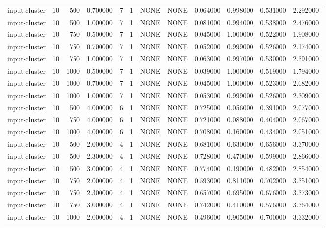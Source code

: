 \begin{tabular}{lrrrllllrrrr}
input-cluster & 10 & 500 & 0.700000 & 7 & 1 & NONE & NONE & 0.064000 & 0.998000 & 0.531000 & 2.292000 \\
input-cluster & 10 & 500 & 1.000000 & 7 & 1 & NONE & NONE & 0.081000 & 0.994000 & 0.538000 & 2.476000 \\
input-cluster & 10 & 750 & 0.500000 & 7 & 1 & NONE & NONE & 0.045000 & 1.000000 & 0.522000 & 1.908000 \\
input-cluster & 10 & 750 & 0.700000 & 7 & 1 & NONE & NONE & 0.052000 & 0.999000 & 0.526000 & 2.174000 \\
input-cluster & 10 & 750 & 1.000000 & 7 & 1 & NONE & NONE & 0.063000 & 0.997000 & 0.530000 & 2.391000 \\
input-cluster & 10 & 1000 & 0.500000 & 7 & 1 & NONE & NONE & 0.039000 & 1.000000 & 0.519000 & 1.794000 \\
input-cluster & 10 & 1000 & 0.700000 & 7 & 1 & NONE & NONE & 0.045000 & 1.000000 & 0.523000 & 2.082000 \\
input-cluster & 10 & 1000 & 1.000000 & 7 & 1 & NONE & NONE & 0.053000 & 0.999000 & 0.526000 & 2.309000 \\
input-cluster & 10 & 500 & 4.000000 & 6 & 1 & NONE & NONE & 0.725000 & 0.056000 & 0.391000 & 2.077000 \\
input-cluster & 10 & 750 & 4.000000 & 6 & 1 & NONE & NONE & 0.721000 & 0.088000 & 0.404000 & 2.067000 \\
input-cluster & 10 & 1000 & 4.000000 & 6 & 1 & NONE & NONE & 0.708000 & 0.160000 & 0.434000 & 2.051000 \\
input-cluster & 10 & 500 & 2.000000 & 4 & 1 & NONE & NONE & 0.681000 & 0.630000 & 0.656000 & 3.370000 \\
input-cluster & 10 & 500 & 2.300000 & 4 & 1 & NONE & NONE & 0.728000 & 0.470000 & 0.599000 & 2.866000 \\
input-cluster & 10 & 500 & 3.000000 & 4 & 1 & NONE & NONE & 0.774000 & 0.190000 & 0.482000 & 2.854000 \\
input-cluster & 10 & 750 & 2.000000 & 4 & 1 & NONE & NONE & 0.593000 & 0.811000 & 0.702000 & 3.351000 \\
input-cluster & 10 & 750 & 2.300000 & 4 & 1 & NONE & NONE & 0.657000 & 0.695000 & 0.676000 & 3.373000 \\
input-cluster & 10 & 750 & 3.000000 & 4 & 1 & NONE & NONE & 0.742000 & 0.410000 & 0.576000 & 3.364000 \\
input-cluster & 10 & 1000 & 2.000000 & 4 & 1 & NONE & NONE & 0.496000 & 0.905000 & 0.700000 & 3.332000 \\

\end{tabular}
